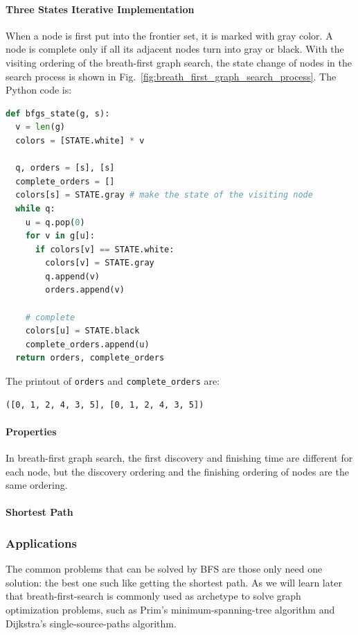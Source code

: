 \documentclass[../main.tex]{subfiles}
\begin{document}
\paragraph{Three States Iterative Implementation} When a node is first put into the frontier set, it is marked with gray color. A node is complete only if all its adjacent nodes turn into gray or black. With the visiting ordering of the breath-first graph search, the state change of nodes in the search process is shown in Fig.~\ref{fig:breath_first_graph_search_process}. The Python code is:
\begin{lstlisting}[language=Python]
def bfgs_state(g, s):
  v = len(g)
  colors = [STATE.white] * v
  
  q, orders = [s], [s]
  complete_orders = []
  colors[s] = STATE.gray # make the state of the visiting node
  while q:
    u = q.pop(0)   
    for v in g[u]:
      if colors[v] == STATE.white:
        colors[v] = STATE.gray
        q.append(v)
        orders.append(v)

    # complete 
    colors[u] = STATE.black
    complete_orders.append(u)
  return orders, complete_orders
\end{lstlisting}
The printout of \texttt{orders} and \texttt{complete\_orders} are:
\begin{lstlisting}[numbers=none]
([0, 1, 2, 4, 3, 5], [0, 1, 2, 4, 3, 5])
\end{lstlisting}
\paragraph{Properties} In breath-first graph search, the first discovery and finishing time are different for each node, but the discovery ordering and the finishing ordering of nodes are the same ordering. 

\paragraph{Shortest Path}











 \subsubsection{Applications} The common problems that can be solved by BFS are those only need one solution: the best one such like getting the shortest path. As  we will learn later that breath-first-search is commonly used as archetype to solve graph optimization problems, such as Prim's minimum-spanning-tree algorithm and Dijkstra's single-source-paths algorithm.
\end{document}
